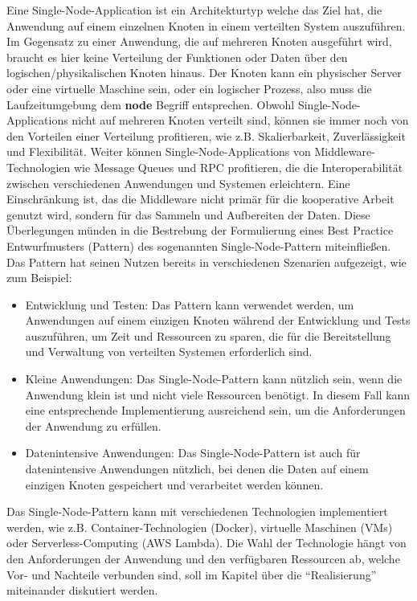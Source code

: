 \documentclass[../vs-script-first-v01.tex]{subfiles}
\begin{document}
Eine Single-Node-Application ist ein Architekturtyp welche das Ziel hat, die Anwendung auf einem einzelnen Knoten in einem verteilten System auszuführen. Im Gegensatz zu einer Anwendung, die auf mehreren Knoten ausgeführt wird, braucht es hier keine Verteilung der Funktionen oder Daten über den logischen/physikalischen Knoten hinaus. Der Knoten kann ein physischer Server oder eine virtuelle Maschine sein, oder ein logischer Prozess, also muss die Laufzeitumgebung dem \textbf{node} Begriff entsprechen.
Obwohl Single-Node-Applications nicht auf mehreren Knoten verteilt sind, können sie immer noch von den Vorteilen einer Verteilung profitieren, wie z.B. Skalierbarkeit, Zuverlässigkeit und Flexibilität. Weiter können
Single-Node-Applications von Middleware-Technologien wie Message Queues und RPC profitieren, die die Interoperabilität zwischen verschiedenen Anwendungen und Systemen erleichtern. Eine Einschränkung ist, das die Middleware nicht primär für die kooperative Arbeit genutzt wird, sondern für das Sammeln und Aufbereiten der Daten. Diese Überlegungen münden in die Bestrebung der Formulierung eines Best Practice Entwurfmusters (Pattern) des sogenannten Single-Node-Pattern miteinfließen. Das Pattern hat seinen Nutzen bereits in verschiedenen Szenarien aufgezeigt, wie zum Beispiel:
\begin{itemize}
\item Entwicklung und Testen: Das Pattern kann verwendet werden, um Anwendungen auf einem einzigen Knoten während der Entwicklung und Tests auszuführen, um Zeit und Ressourcen zu sparen, die für die Bereitstellung und Verwaltung von verteilten Systemen erforderlich sind.
\item Kleine Anwendungen: Das Single-Node-Pattern kann nützlich sein, wenn die Anwendung klein ist und nicht viele Ressourcen benötigt. In diesem Fall kann eine entsprechende Implementierung ausreichend sein, um die Anforderungen der Anwendung zu erfüllen.
\item Datenintensive Anwendungen: Das Single-Node-Pattern ist auch für datenintensive Anwendungen nützlich, bei denen die Daten auf einem einzigen Knoten gespeichert und verarbeitet werden können.
\end{itemize}
Das Single-Node-Pattern kann mit verschiedenen Technologien implementiert werden, wie z.B. Container-Technologien (Docker), virtuelle Maschinen (VMs) oder Serverless-Computing (AWS Lambda). Die Wahl der Technologie hängt von den Anforderungen der Anwendung und den verfügbaren Ressourcen ab, welche Vor- und Nachteile verbunden sind, soll im Kapitel über die \enquote{Realisierung} miteinander diskutiert werden. 
\end{document}
